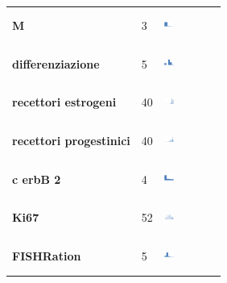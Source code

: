 \begin{table}[htbp]
\begin{tabularx}{0.7\textwidth}{lXX}
\textbf{M} & 3 & \includegraphics[width=0.2\textwidth, height=10mm]{methodology/images/m} \\
\textbf{differenziazione} & 5 & \includegraphics[width=0.2\textwidth, height=10mm]{methodology/images/differenziazione}  \\
\textbf{recettori estrogeni} & 40 & \includegraphics[width=0.2\textwidth, height=10mm]{methodology/images/recettori_estrogeni} \\
\textbf{recettori progestinici} & 40 & \includegraphics[width=0.2\textwidth, height=10mm]{methodology/images/recettori_progestinici}\\
\textbf{c erbB 2} & 4 & \includegraphics[width=0.2\textwidth, height=10mm]{methodology/images/c_erb_2}\\
\textbf{Ki67} & 52 & \includegraphics[width=0.2\textwidth, height=10mm]{methodology/images/ki67}\\
\textbf{FISHRation} & 5 &  \includegraphics[width=0.2\textwidth, height=10mm]{methodology/images/fish}\\
\bottomrule
\end{tabularx}
\label{tab:datasetdistribution}
\end{table}


